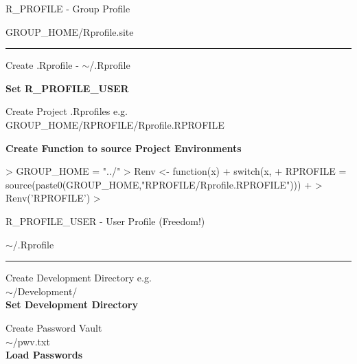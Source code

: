 \documentclass{beamer}
\begin{document}
\begin{frame}{R\_PROFILE - Group Profile}

\begin{center} GROUP\_HOME/Rprofile.site\\ \end{center}
\begin{center}
\rule{4cm}{0.6pt}
\end{center}

\begin{center}Create .Rprofile - $\sim$/.Rprofile\\\end{center}
\textbf{Set R\_PROFILE\_USER\\}

\begin{center}
 Create Project .Rprofiles e.g.\\ GROUP\_HOME/RPROFILE/Rprofile.RPROFILE
\end{center}

\textbf{Create Function to source Project Environments \\}
\end{frame}

\begin{Schunk}
\begin{Sinput}
> GROUP_HOME = "../"
> Renv <- function(x){
+  switch(x,
+        RPROFILE = source(paste0(GROUP_HOME,"RPROFILE/Rprofile.RPROFILE")))
+ }
> Renv('RPROFILE') 
>  
\end{Sinput}
\end{Schunk}


\begin{frame}{R\_PROFILE\_USER - User Profile {\color{green} (Freedom!)}}

\begin{center} $\sim$/.Rprofile\\ \end{center}
\begin{center}
\rule{4cm}{0.6pt}
\end{center}

\bigskip

\begin{center}
Create Development Directory e.g.\\ $\sim$/Development/ \\ 
\textbf{Set Development Directory}
\end{center}

\begin{center}
Create Password Vault \\ $\sim$/pwv.txt \\ 
\textbf{Load Passwords}\\
\end{center}

\end{frame}
\end{document}
